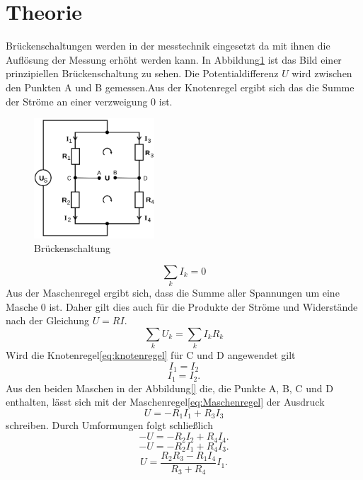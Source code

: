 \section{Theorie}
\label{sec:Theorie}

\cite{sample}
Brückenschaltungen werden in der messtechnik eingesetzt da mit ihnen die Auflösung
der Messung erhöht werden kann.
In Abbildung\ref{fig:Brueckenschaltung} ist das Bild einer prinzipiellen Brückenschaltung zu sehen.
Die Potentialdifferenz $U$ wird zwischen den Punkten A und B gemessen.Aus der
Knotenregel ergibt sich das die Summe der Ströme an einer verzweigung $0$ ist.
\begin{figure}
  \centering
  \includegraphics[width=0.4\textwidth]{Bilder/Brueckenschaltung.png}
  \caption{Brückenschaltung}
  \label{fig:Brueckenschaltung}
\end{figure}
\begin{equation}
  \sum \limits_{k} I_k= 0
  \label{eq:knotenregel}
\end{equation}
Aus der Maschenregel ergibt sich, dass die Summe aller Spannungen um eine Masche
$0$ ist. Daher gilt dies auch für die Produkte der Ströme und Widerstände nach
der Gleichung $U=RI$.
\begin{equation}
  \sum \limits_{k} U_k=  \sum \limits_{k} I_k R_k
  \label{eq:Maschenregel}
\end{equation}
Wird die Knotenregel\eqref{eq:knotenregel} für C und D angewendet gilt
\begin{equation}
  I_1=I_2
\end{equation}
\begin{equation}
  I_1=I_2    .
\end{equation}
Aus den beiden Maschen in der Abbildung\ref{} die, die Punkte A, B, C und D enthalten,
lässt sich mit der Maschenregel\eqref{eq:Maschenregel} der Ausdruck
\begin{equation}
  U=-R_1 I_1 + R_3 I_3
\end{equation}
schreiben. Durch Umformungen folgt schließlich
\begin{equation}
  -U=-R_2 I_2 + R_4 I_4   .
\end{equation}
\begin{equation}
  -U=-R_2 I_1 + R_4 I_3   .
\end{equation}
\begin{equation}
  U=\frac{R_2 R_3 - R_1 I_4}{R_3 + R_4}I_1   .
\end{equation}

